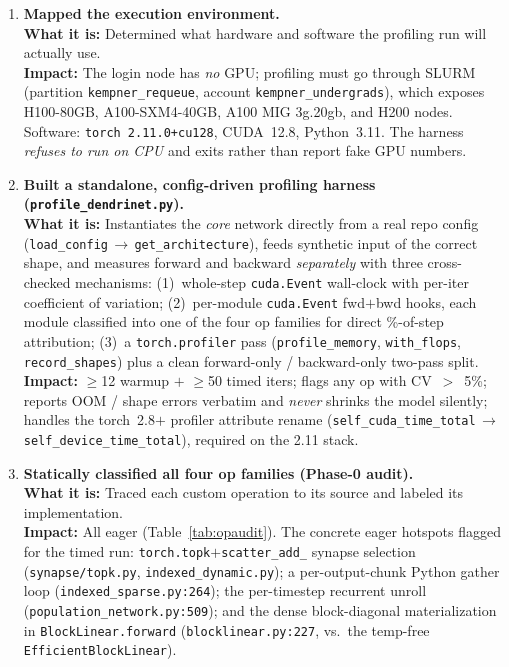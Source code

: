 \documentclass[11pt]{article}
\newcommand{\what}[1]{\textbf{What it is:} #1}
\newcommand{\impact}[1]{\textbf{Impact:} #1}
\begin{document}
\begin{enumerate}[leftmargin=*]

\item \textbf{Mapped the execution environment.}\\
\what{Determined what hardware and software the profiling run will actually use.}\\
\impact{The login node has \emph{no} GPU; profiling must go through SLURM (partition
\texttt{kempner\_requeue}, account \texttt{kempner\_undergrads}), which exposes H100-80GB,
A100-SXM4-40GB, A100 MIG 3g.20gb, and H200 nodes. Software: \texttt{torch 2.11.0+cu128},
CUDA~12.8, Python~3.11. The harness \emph{refuses to run on CPU} and exits rather than
report fake GPU numbers.}

\item \textbf{Built a standalone, config-driven profiling harness (\texttt{profile\_dendrinet.py}).}\\
\what{Instantiates the \emph{core} network directly from a real repo config
(\texttt{load\_config}\,$\rightarrow$\,\texttt{get\_architecture}), feeds synthetic input of the
correct shape, and measures forward and backward \emph{separately} with three cross-checked
mechanisms: (1)~whole-step \texttt{cuda.Event} wall-clock with per-iter coefficient of variation;
(2)~per-module \texttt{cuda.Event} fwd$+$bwd hooks, each module classified into one of the four
op families for direct \%-of-step attribution; (3)~a \texttt{torch.profiler} pass
(\texttt{profile\_memory}, \texttt{with\_flops}, \texttt{record\_shapes}) plus a clean
forward-only / backward-only two-pass split.}\\
\impact{$\geq$12 warmup $+$ $\geq$50 timed iters; flags any op with CV~$>$~5\%; reports OOM /
shape errors verbatim and \emph{never} shrinks the model silently; handles the torch~2.8$+$
profiler attribute rename (\texttt{self\_cuda\_time\_total}\,$\rightarrow$\,%
\texttt{self\_device\_time\_total}), required on the 2.11 stack.}

\item \textbf{Statically classified all four op families (Phase-0 audit).}\\
\what{Traced each custom operation to its source and labeled its implementation.}\\
\impact{All eager (Table~\ref{tab:opaudit}). The concrete eager hotspots flagged for the timed
run: \texttt{torch.topk}$+$\texttt{scatter\_add\_} synapse selection
(\texttt{synapse/topk.py}, \texttt{indexed\_dynamic.py}); a per-output-chunk Python gather loop
(\texttt{indexed\_sparse.py:264}); the per-timestep recurrent unroll
(\texttt{population\_network.py:509}); and the dense block-diagonal materialization in
\texttt{BlockLinear.forward} (\texttt{blocklinear.py:227}, vs.\ the temp-free
\texttt{EfficientBlockLinear}).}


\end{enumerate}
\end{document}
